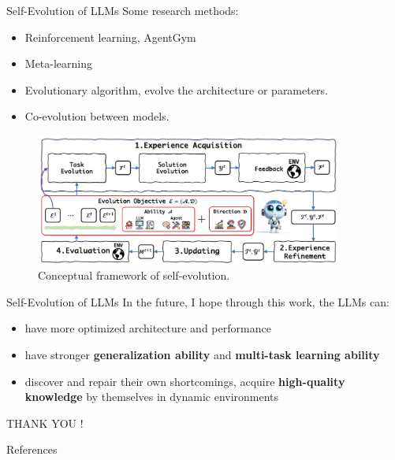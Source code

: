 \documentclass[10pt]{beamer}
\begin{document}
\begin{frame}{Self-Evolution of LLMs}
Some research methods:
\begin{itemize}
    \item Reinforcement learning, AgentGym\cite{agentgym}
    \item Meta-learning
    \item Evolutionary algorithm, evolve the architecture or parameters.
    \item Co-evolution between models.
\end{itemize}
\begin{figure}
    \centering
    \includegraphics[width=0.9\textwidth]{pic/frameLLM.png}
    \caption{Conceptual framework of self-evolution.\cite{LLMsurvey}}
    \label{fig:my_label}
\end{figure}
\end{frame}

\begin{frame}{Self-Evolution of LLMs}
In the future, I hope through this work, the LLMs can:
\begin{itemize}
    \item have more optimized architecture and performance
    \item have stronger \textbf{generalization ability} and \textbf{multi-task learning ability}
    \item discover and repair their own shortcomings, acquire \textbf{high-quality knowledge} by themselves in dynamic environments
\end{itemize}
\end{frame}



\begin{frame}[standout]
  THANK YOU !
\end{frame}

\begin{frame}{References}
\printbibliography
\end{frame}
\end{document}
